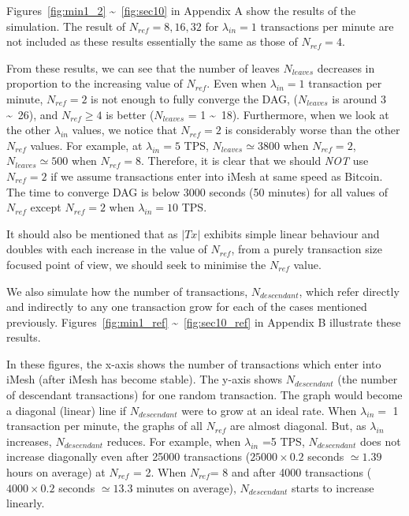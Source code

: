 \documentclass[a4paper,10pt,twocolumn]{article}
\begin{document}
	\vspace{-3.5mm}
	
	Figures~\ref{fig:min1_2} \textasciitilde~\ref{fig:sec10} in Appendix A show the results of the simulation.
		 The result of \( N_{ref}=8,16,32\) for \( \lambda_{in}=1\) transactions per minute are not included
		 as these results essentially the same as those of \( N_{ref}=4\).
	
	\vspace{2.5mm}
	
		 From these results, we can see that the number of leaves \( N_{leaves}\) decreases in proportion to the increasing value of \( N_{ref} \).
		 Even when \( \lambda_{in}=1\) transaction per minute, \( N_{ref}=2\) is not enough to fully converge the DAG, (\( N_{leaves}\) is around 3 \textasciitilde~26),
		 and \( N_{ref} \ge 4\)  is better (\( N_{leaves}\) = 1 \textasciitilde~18).
		 Furthermore, when we look at the other \( \lambda_{in}\) values, we notice that \( N_{ref}=2\) is considerably worse than the other \( N_{ref}\) values.
		 For example, at \( \lambda_{in}=5\) TPS,  \( N_{leaves} \simeq 3800 \) when \( N_{ref}=2\),
		\( N_{leaves} \simeq 500\)  when \( N_{ref}=8\). Therefore, it is clear that we should \emph{NOT} use \( N_{ref}=2\) if we assume 
		transactions enter into iMesh at same speed as Bitcoin.
		The time to converge DAG is below 3000 seconds (50 minutes) for all values of \( N_{ref} \) except \( N_{ref}=2\) when \( \lambda_{in}=10\) TPS\@.
	
	\vspace{2.5mm}
		
		It should also be mentioned that as \(|Tx|\) exhibits simple linear behaviour and doubles with each increase in the value of \( N_{ref} \), from a purely transaction size focused point of view, we should seek 
		to minimise the \( N_{ref} \) value.
	
	\vspace{2.5mm}
		
		We also simulate how the number of transactions, \( N_{descendant} \), which refer directly and indirectly to any one transaction grow 
		 for each of the cases mentioned previously. Figures~\ref{fig:min1_ref} \textasciitilde~\ref{fig:sec10_ref} in Appendix B illustrate these results.
	
	\vspace{2.5mm}
		 
		 In these figures, the x-axis shows the number of transactions which enter into iMesh (after iMesh has become stable). The y-axis shows \( N_{descendant} \) 
		 (the number of descendant transactions) for one random transaction. The graph would become a diagonal (linear) line if \( N_{descendant} \) were to grow at an ideal rate.
		 When \( \lambda_{in}=\) 1 transaction per minute, the graphs of all \( N_{ref}\) are almost diagonal.
		 But, as \( \lambda_{in}\) increases,  \( N_{descendant} \) reduces.
		 For example, when \( \lambda_{in}\) =5 TPS, \( N_{descendant} \) 
		 does not increase diagonally even after  25000 transactions (\( 25000 \times 0.2\) seconds \(\simeq 1.39 \) hours on average) at \( N_{ref} \) = 2.
	When \( N_{ref}\)= 8 and after 4000 transactions (\( 4000 \times 0.2\) seconds \(\simeq 13.3 \) minutes on average),
	 \( N_{descendant}\) starts to increase linearly.
	
\end{document}
